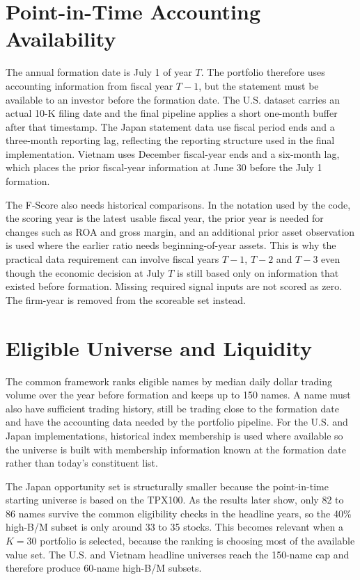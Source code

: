 \documentclass[11pt,a4paper]{report}
\numberwithin{figure}{chapter}
\numberwithin{table}{chapter}
\numberwithin{equation}{chapter}
\begin{document}
\section{Point-in-Time Accounting Availability}
\label{sec:point_in_time}

The annual formation date is July 1 of year $T$. The portfolio therefore uses accounting information from fiscal year $T-1$, but the statement must be available to an investor before the formation date. The U.S. dataset carries an actual 10-K filing date and the final pipeline applies a short one-month buffer after that timestamp. The Japan statement data use fiscal period ends and a three-month reporting lag, reflecting the reporting structure used in the final implementation. Vietnam uses December fiscal-year ends and a six-month lag, which places the prior fiscal-year information at June 30 before the July 1 formation.

The F-Score also needs historical comparisons. In the notation used by the code, the scoring year is the latest usable fiscal year, the prior year is needed for changes such as ROA and gross margin, and an additional prior asset observation is used where the earlier ratio needs beginning-of-year assets. This is why the practical data requirement can involve fiscal years $T-1$, $T-2$ and $T-3$ even though the economic decision at July $T$ is still based only on information that existed before formation. Missing required signal inputs are not scored as zero. The firm-year is removed from the scoreable set instead.

\section{Eligible Universe and Liquidity}

The common framework ranks eligible names by median daily dollar trading volume over the year before formation and keeps up to 150 names. A name must also have sufficient trading history, still be trading close to the formation date and have the accounting data needed by the portfolio pipeline. For the U.S. and Japan implementations, historical index membership is used where available so the universe is built with membership information known at the formation date rather than today's constituent list.

The Japan opportunity set is structurally smaller because the point-in-time starting universe is based on the TPX100. As the results later show, only 82 to 86 names survive the common eligibility checks in the headline years, so the 40\% high-B/M subset is only around 33 to 35 stocks. This becomes relevant when a $K=30$ portfolio is selected, because the ranking is choosing most of the available value set. The U.S. and Vietnam headline universes reach the 150-name cap and therefore produce 60-name high-B/M subsets.
\end{document}
